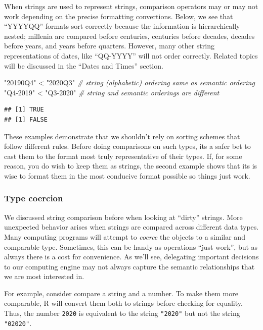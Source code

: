 \documentclass[
]{krantz}
\makeatletter
\newenvironment{Shaded}{\begin{snugshade}}{\end{snugshade}}
\newcommand{\CommentTok}[1]{\textcolor[rgb]{0.37,0.37,0.37}{\textit{#1}}}
\newcommand{\SpecialCharTok}[1]{\textcolor[rgb]{0,0,0}{#1}}
\newcommand{\StringTok}[1]{\textcolor[rgb]{0.5,0.5,0.5}{#1}}
\newenvironment{kframe}{%
\medskip{}
\setlength{\fboxsep}{.8em}
 \def\at@end@of@kframe{}%
 \ifinner\ifhmode%
  \def\at@end@of@kframe{\end{minipage}}%
  \begin{minipage}{\columnwidth}%
 \fi\fi%
 \def\FrameCommand##1{\hskip\@totalleftmargin \hskip-\fboxsep
 \colorbox{shadecolor}{##1}\hskip-\fboxsep
     \hskip-\linewidth \hskip-\@totalleftmargin \hskip\columnwidth}%
 \MakeFramed {\advance\hsize-\width
   \@totalleftmargin\z@ \linewidth\hsize
   \@setminipage}}%
 {\par\unskip\endMakeFramed%
 \at@end@of@kframe}
\renewenvironment{Shaded}{\begin{kframe}}{\end{kframe}}
\makeatother
\begin{document}
When strings are used to represent strings, comparison operators may or may not work depending on the precise formatting convertions. Below, we see that ``YYYYQQ''-formats sort correctly because the information is hierarchically nested; millenia are compared before centuries, centuries before decades, decades before years, and years before quarters. However, many other string representations of dates, like ``QQ-YYYY'' will not order correctly. Related topics will be discussed in the ``Dates and Times'' section.

\begin{Shaded}
\begin{Highlighting}[]
\StringTok{"20190Q4"} \SpecialCharTok{\textless{}} \StringTok{"2020Q3"} \CommentTok{\# string (alphabetic) ordering same as semantic ordering}
\StringTok{"Q4{-}2019"} \SpecialCharTok{\textless{}} \StringTok{"Q3{-}2020"} \CommentTok{\# string and semantic orderings are different}
\end{Highlighting}
\end{Shaded}

\begin{verbatim}
## [1] TRUE
## [1] FALSE
\end{verbatim}

These examples demonstrate that we shouldn't rely on sorting schemes that follow different rules. Before doing comparisons on such types, its a safer bet to cast them to the format most truly representative of their types. If, for some reason, you do wish to keep them as strings, the second example shows that its is wise to format them in the most conducive format possible so things just work.

\hypertarget{type-coercion}{%
\subsubsection{Type coercion}\label{type-coercion}}

We discussed string comparison before when looking at ``dirty'' strings. More unexpected behavior arises when strings are compared across different data types. Many computing programs will attempt to \emph{coerce} the objects to a similar and comparable type. Sometimes, this can be handy as operations ``just work'', but as always there is a cost for convenience. As we'll see, delegating important decisions to our computing engine may not always capture the semantic relationships that we are most interested in.

For example, consider compare a string and a number. To make them more comparable, R will convert them both to strings before checking for equality. Thus, the number \texttt{2020} is equivalent to the string \texttt{"2020"} but not the string \texttt{"02020"}.
\end{document}
